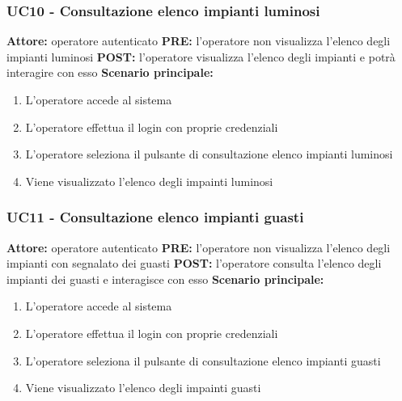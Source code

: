 \documentclass[a4paper, 12pt]{article}
\begin{document}
\subsubsection{UC10 - Consultazione elenco impianti luminosi}
\textbf{Attore:} operatore autenticato\newline
\textbf{PRE:} l'operatore non visualizza l'elenco degli impianti luminosi\newline
\textbf{POST:} l'operatore visualizza l'elenco degli impianti e potrà interagire con esso\newline
\textbf{Scenario principale:}
\begin{enumerate}
    \item L'operatore accede al sistema
    \item L'operatore effettua il login con proprie credenziali
    \item L'operatore seleziona il pulsante di consultazione elenco impianti luminosi
    \item Viene visualizzato l'elenco degli impainti luminosi
\end{enumerate}

\subsubsection{UC11 - Consultazione elenco impianti guasti}
\textbf{Attore:} operatore autenticato\newline
\textbf{PRE:} l'operatore non visualizza l'elenco degli impianti con segnalato dei guasti\newline
\textbf{POST:} l'operatore consulta l'elenco degli impianti dei guasti e interagisce con esso\newline
\textbf{Scenario principale:}
\begin{enumerate}
    \item L'operatore accede al sistema
    \item L'operatore effettua il login con proprie credenziali
    \item L'operatore seleziona il pulsante di consultazione elenco impianti guasti
    \item Viene visualizzato l'elenco degli impainti guasti
\end{enumerate}
\end{document}
